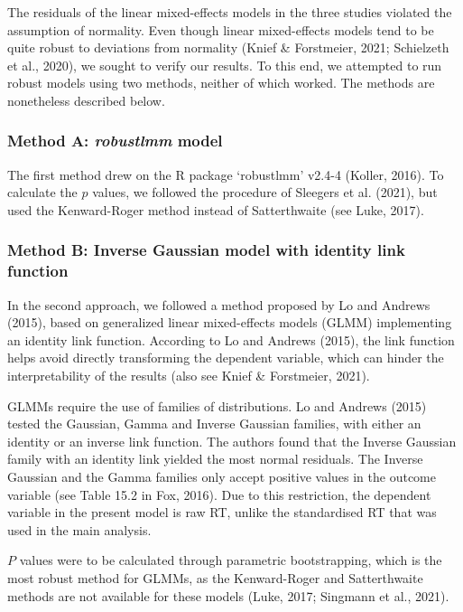 \documentclass[
  12pt,
  man,floatsintext]{apa7}
\begin{document}
The residuals of the linear mixed-effects models in the three studies violated the assumption of normality. Even though linear mixed-effects models tend to be quite robust to deviations from normality (Knief \& Forstmeier, 2021; Schielzeth et al., 2020), we sought to verify our results. To this end, we attempted to run robust models using two methods, neither of which worked. The methods are nonetheless described below.

\hypertarget{method-a-robustlmm-model}{%
\subsubsection{\texorpdfstring{Method A: \emph{robustlmm} model}{Method A: robustlmm model}}\label{method-a-robustlmm-model}}

The first method drew on the R package `robustlmm' v2.4-4 (Koller, 2016). To calculate the \(p\) values, we followed the procedure of Sleegers et al. (2021), but used the Kenward-Roger method instead of Satterthwaite (see Luke, 2017).

\hypertarget{method-b-inverse-gaussian-model-with-identity-link-function}{%
\subsubsection{Method B: Inverse Gaussian model with identity link function}\label{method-b-inverse-gaussian-model-with-identity-link-function}}

In the second approach, we followed a method proposed by Lo and Andrews (2015), based on generalized linear mixed-effects models (GLMM) implementing an identity link function. According to Lo and Andrews (2015), the link function helps avoid directly transforming the dependent variable, which can hinder the interpretability of the results (also see Knief \& Forstmeier, 2021).

GLMMs require the use of families of distributions. Lo and Andrews (2015) tested the Gaussian, Gamma and Inverse Gaussian families, with either an identity or an inverse link function. The authors found that the Inverse Gaussian family with an identity link yielded the most normal residuals. The Inverse Gaussian and the Gamma families only accept positive values in the outcome variable (see Table 15.2 in Fox, 2016). Due to this restriction, the dependent variable in the present model is raw RT, unlike the standardised RT that was used in the main analysis.

\(P\) values were to be calculated through parametric bootstrapping, which is the most robust method for GLMMs, as the Kenward-Roger and Satterthwaite methods are not available for these models (Luke, 2017; Singmann et al., 2021).
\end{document}
